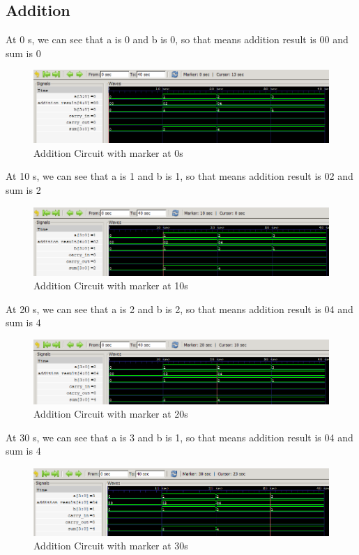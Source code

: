 \documentclass[12pt]{article}
\begin{document}
\newpage


\subsection{Addition}

At 0 s, we can see that a is 0 and b is 0, so that means addition result is 00 and sum is 0
\begin{figure}[h]
    \centering
    \includegraphics[width = 1.0\textwidth]{figs/Add0.png}
    \caption{Addition Circuit with marker at 0s}
    \label{fig:enter-label}
\end{figure}

At 10 s, we can see that a is 1 and b is 1, so that means addition result is 02 and sum is 2
\begin{figure}[h]
    \centering
    \includegraphics[width = 1.0\textwidth]{figs/Add10.png}
    \caption{Addition Circuit with marker at 10s}
    \label{fig:enter-label}
\end{figure}

At 20 s, we can see that a is 2 and b is 2, so that means addition result is 04 and sum is 4 
\begin{figure}[h]
    \centering
    \includegraphics[width = 1.0\textwidth]{figs/Add20.png}
    \caption{Addition Circuit with marker at 20s}
    \label{fig:enter-label}
\end{figure}

\newpage

At 30 s, we can see that a is 3 and b is 1, so that means addition result is 04 and sum is 4
\begin{figure}[h]
    \centering
    \includegraphics[width = 1.0\textwidth]{figs/Add30.png}
    \caption{Addition Circuit with marker at 30s}
    \label{fig:enter-label}
\end{figure}
\end{document}
